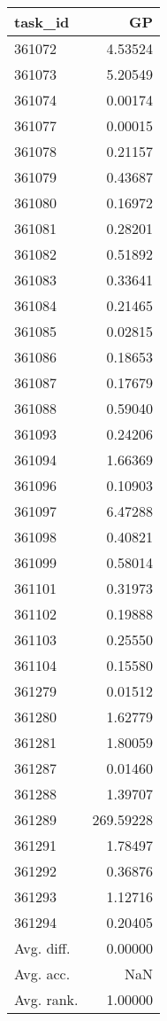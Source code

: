 \begin{tabular}{lr}
\toprule
task\_id & GP \\
\midrule
361072 & 4.53524 \\
361073 & 5.20549 \\
361074 & 0.00174 \\
361077 & 0.00015 \\
361078 & 0.21157 \\
361079 & 0.43687 \\
361080 & 0.16972 \\
361081 & 0.28201 \\
361082 & 0.51892 \\
361083 & 0.33641 \\
361084 & 0.21465 \\
361085 & 0.02815 \\
361086 & 0.18653 \\
361087 & 0.17679 \\
361088 & 0.59040 \\
361093 & 0.24206 \\
361094 & 1.66369 \\
361096 & 0.10903 \\
361097 & 6.47288 \\
361098 & 0.40821 \\
361099 & 0.58014 \\
361101 & 0.31973 \\
361102 & 0.19888 \\
361103 & 0.25550 \\
361104 & 0.15580 \\
361279 & 0.01512 \\
361280 & 1.62779 \\
361281 & 1.80059 \\
361287 & 0.01460 \\
361288 & 1.39707 \\
361289 & 269.59228 \\
361291 & 1.78497 \\
361292 & 0.36876 \\
361293 & 1.12716 \\
361294 & 0.20405 \\
Avg. diff. & 0.00000 \\
Avg. acc. & NaN \\
Avg. rank. & 1.00000 \\
\bottomrule
\end{tabular}
